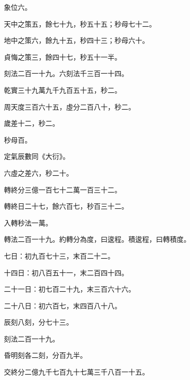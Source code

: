\begin{pinyinscope}
 象位六。



 天中之策五，餘七十九，秒五十五；秒母七十二。



 地中之策六，餘九十五，秒四十三；秒母六十。



 貞悔之策三，餘四十七，秒五十一半。



 刻法二百一十九。六刻法千三百一十四。



 乾實三十九萬九千九百五十五，秒二。



 周天度三百六十五，虛分二百八十，秒二。



 歲差十二，秒二。



 秒母百。



 定氣辰數同《大衍》。



 六虛之差六，秒二十。



 轉終分三億一百七十二萬一百三十二。



 轉終日二十七，餘六百七，秒百三十二。



 入轉秒法一萬。



 轉法二百一十九。約轉分為度，曰逡程。積逡程，曰轉積度。



 七日：初九百七十三，末百二十二。



 十四日：初八百五十一，末二百四十四。



 二十一日：初七百二十九，末三百六十六。



 二十八日：初六百七，末四百八十八。



 辰刻八刻，分七十三。



 刻法二百一十九。



 昏明刻各二刻，分百九半。



 交終分二億九千七百九十七萬三千八百一十五。




\end{pinyinscope}
